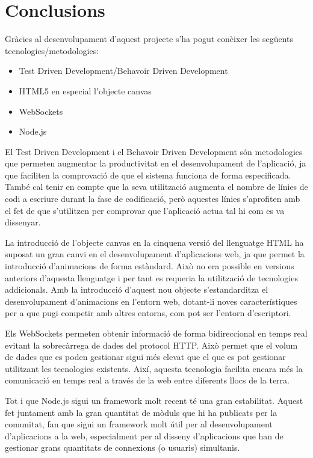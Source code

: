 \chapter{Conclusions}
\label{chap:conclusions}

Gràcies al desenvolupament d'aquest projecte s'ha pogut conèixer les següents tecnologies/metodologies: 

\begin{itemize}
\item{Test Driven Development/Behavoir Driven Development}
\item{HTML5 en especial l'objecte canvas}
\item{WebSockets}
\item{Node.js}
\end{itemize}

El Test Driven Development i el Behavoir Driven Development són metodologies que permeten augmentar la productivitat en el desenvolupament de l'aplicació, ja que faciliten la comprovació de que el sistema funciona de forma especificada. També cal tenir en compte que la seva utilització augmenta el nombre de línies de codi a escriure durant la fase de codificació, però aquestes línies s'aprofiten amb el fet de que s'utilitzen per comprovar que l'aplicació actua tal hi com es va dissenyar. 

La introducció de l'objecte canvas en la cinquena versió del llenguatge HTML ha suposat un gran canvi en el desenvolupament d'aplicacions web, ja que permet la introducció d'animacions de forma estàndard. Això no era possible en versions anteriors d'aquesta llenguatge i per tant es requeria la utilització de tecnologies addicionals. Amb la introducció d'aquest nou objecte s'estandarditza el desenvolupament d'animacions en l'entorn web, dotant-li noves característiques per a que pugi competir amb altres entorns, com pot ser l'entorn d'escriptori. 

Els WebSockets permeten obtenir informació de forma bidireccional en temps real evitant la sobrecàrrega de dades del protocol HTTP. Això permet que el volum de dades que es poden gestionar sigui més elevat que el que es pot gestionar utilitzant les tecnologies existents. Així, aquesta tecnologia facilita encara més la comunicació en temps real a través de la web entre diferents llocs de la terra. 

Tot i que Node.js sigui un framework molt recent té una gran estabilitat. Aquest fet juntament amb la gran quantitat de mòduls que hi ha publicats per la comunitat, fan que sigui un framework molt útil per al desenvolupament d'aplicacions a la web, especialment per al disseny d'aplicacions que han de gestionar grans quantitats de connexions (o usuaris) simultanis. 

